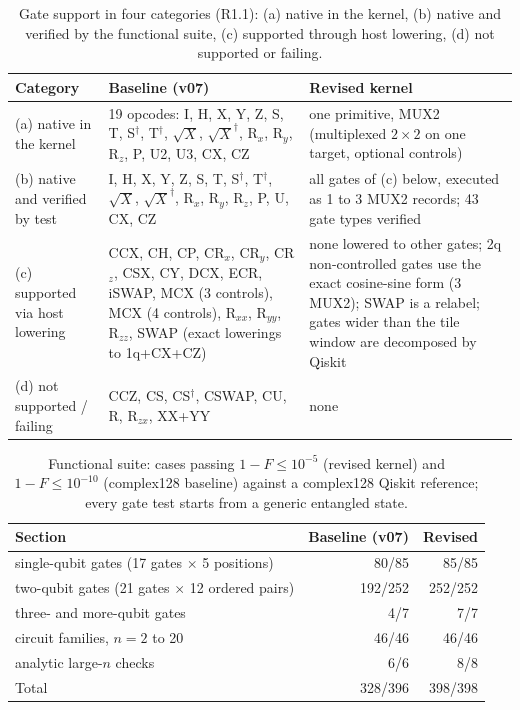 \documentclass[pdflatex,sn-mathphys-num]{sn-jnl}
\theoremstyle{thmstyleone}
\theoremstyle{thmstylethree}
\begin{document}
\begin{table}
\centering
\caption{Gate support in four categories (R1.1): (a) native in the kernel, (b) native and verified by the functional suite, (c) supported through host lowering, (d) not supported or failing.}\label{tab:gates}
\small
\begin{tabular}{p{2.6cm}p{4.4cm}p{4.4cm}}
\toprule
Category & Baseline (v07) & Revised kernel \\
\midrule
(a) native in the kernel & 19 opcodes: I, H, X, Y, Z, S, T, S$^\dagger$, T$^\dagger$, $\sqrt{X}$, $\sqrt{X}^\dagger$, R$_x$, R$_y$, R$_z$, P, U2, U3, CX, CZ & one primitive, MUX2 (multiplexed $2\times2$ on one target, optional controls) \\
(b) native and verified by test & I, H, X, Y, Z, S, T, S$^\dagger$, T$^\dagger$, $\sqrt{X}$, $\sqrt{X}^\dagger$, R$_x$, R$_y$, R$_z$, P, U, CX, CZ & all gates of (c) below, executed as 1 to 3 MUX2 records; 43 gate types verified \\
(c) supported via host lowering & CCX, CH, CP, CR$_x$, CR$_y$, CR$_z$, CSX, CY, DCX, ECR, iSWAP, MCX (3 controls), MCX (4 controls), R$_{xx}$, R$_{yy}$, R$_{zz}$, SWAP (exact lowerings to 1q+CX+CZ) & none lowered to other gates; 2q non-controlled gates use the exact cosine-sine form (3 MUX2); SWAP is a relabel; gates wider than the tile window are decomposed by Qiskit \\
(d) not supported / failing & CCZ, CS, CS$^\dagger$, CSWAP, CU, R, R$_{zx}$, XX+YY & none \\
\bottomrule
\end{tabular}
\end{table}

\begin{table}
\centering
\caption{Functional suite: cases passing $1-F\leq 10^{-5}$ (revised kernel) and $1-F\leq 10^{-10}$ (complex128 baseline) against a complex128 Qiskit reference; every gate test starts from a generic entangled state.}\label{tab:suite}
\small
\begin{tabular}{lrr}
\toprule
Section & Baseline (v07) & Revised \\
\midrule
single-qubit gates (17 gates $\times$ 5 positions) & 80/85 & 85/85 \\
two-qubit gates (21 gates $\times$ 12 ordered pairs) & 192/252 & 252/252 \\
three- and more-qubit gates & 4/7 & 7/7 \\
circuit families, $n=2$ to 20 & 46/46 & 46/46 \\
analytic large-$n$ checks & 6/6 & 8/8 \\
\midrule
Total & 328/396 & 398/398 \\
\bottomrule
\end{tabular}
\end{table}
\end{document}
